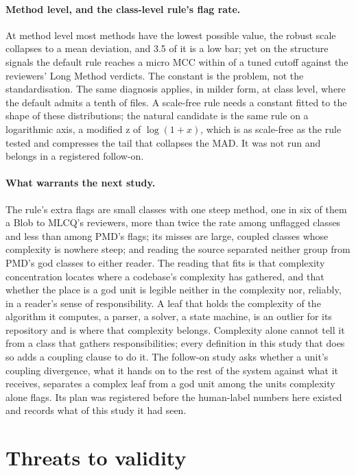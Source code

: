 \documentclass[11pt,a4paper]{article}
\begin{document}
\paragraph{Method level, and the class-level rule's flag rate.} At method
level most methods have the lowest possible value, the robust scale collapses
to a mean deviation, and 3.5 of it is a low bar; yet on the structure signals
the default rule reaches a micro MCC within \humCandLongMethodMaxGap{} of a
tuned cutoff against the reviewers' Long Method verdicts. The constant is the
problem, not the standardisation. The same diagnosis applies, in milder form,
at class level, where the default admits a tenth of files. A scale-free rule
needs a constant fitted to the shape of these distributions; the natural
candidate is the same rule on a logarithmic axis, a modified z of
$\log(1+x)$, which is as scale-free as the rule tested and compresses the tail
that collapses the MAD. It was not run and belongs in a registered follow-on.

\paragraph{What warrants the next study.} The rule's extra flags are small
classes with one steep method, one in six of them a Blob to MLCQ's reviewers,
more than twice the rate among unflagged classes and less than among PMD's
flags; its misses are large, coupled classes whose complexity is nowhere
steep; and reading the source separated neither group from PMD's god classes
to either reader. The reading that fits is that complexity concentration
locates where a codebase's complexity has gathered, and that whether the
place is a god unit is legible neither in the complexity nor, reliably, in a
reader's sense of responsibility. A leaf that holds the complexity of the algorithm it computes,
a parser, a solver, a state machine, is an outlier for its repository and is
where that complexity belongs. Complexity alone cannot tell it from a class
that gathers responsibilities; every definition in this study that does so
adds a coupling clause to do it. The follow-on study asks whether a unit's
coupling divergence, what it hands on to the rest of the system against what
it receives, separates a complex leaf from a god unit among the units
complexity alone flags. Its plan was registered before the human-label
numbers here existed and records what of this study it had seen.

\section{Threats to validity}
\label{sec:threats}
\end{document}
